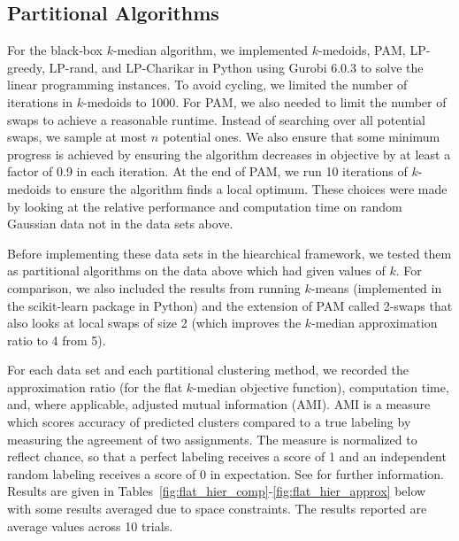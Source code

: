 \documentclass[conference, 10pt, final]{IEEEtran}
\begin{document}
\subsection{Partitional Algorithms}
 For the black-box $k$-median algorithm, we implemented $k$-medoids, PAM, LP-greedy, LP-rand, and LP-Charikar in Python using Gurobi 6.0.3 to solve the linear programming instances. 
To avoid cycling, we limited the number of iterations in $k$-medoids to 1000. For PAM, we also needed to limit the number of swaps to achieve a reasonable runtime. Instead of searching over all potential swaps, we sample at most $n$ potential ones. We also ensure that some minimum progress is achieved by ensuring the algorithm decreases in objective by at least a factor of 0.9 in each iteration. At the end of PAM, we run 10 iterations of $k$-medoids to ensure the algorithm finds a local optimum. These choices were made by looking at the relative performance and computation time on random Gaussian data not in the data sets above.

Before implementing these data sets in the hiearchical framework, we tested them as partitional algorithms on the data above which had given values of $k$. For comparison, we also included the results from running $k$-means (implemented in the scikit-learn package in Python) and the extension of PAM called 2-swaps that also looks at local swaps of size 2 (which improves the $k$-median approximation ratio to 4 from 5). 

For each data set and each partitional clustering method, we recorded the approximation ratio (for the flat $k$-median objective function), computation time, and, where applicable, adjusted mutual information (AMI).  AMI is a measure which scores accuracy of predicted clusters compared to a true labeling by measuring the agreement of two assignments. The measure is normalized to reflect chance, so that a perfect labeling receives a score of 1 and an independent random labeling receives a score of 0 in expectation.  See \cite{Vinh} for further information.  Results are given in Tables~\ref{fig:flat_hier_comp}-\ref{fig:flat_hier_approx}  below with some results averaged due to space constraints. The results reported are average values across 10 trials.
\end{document}
